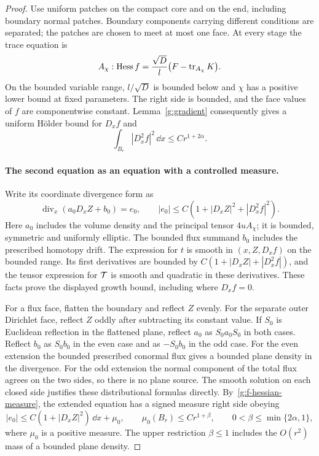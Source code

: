 \begin{proof}
Use uniform patches on the compact core and on the end, including
boundary normal patches.  Boundary components carrying different
conditions are separated; the patches are chosen to meet at most one
face.  At every stage the trace equation is
\begin{equation}\label{g:trace-normalized}
 A_\chi:\operatorname{Hess} f
     =\frac{\sqrt D}{l}\bigl(F-\operatorname{tr}_{A_\chi}K\bigr).
\end{equation}
On the bounded variable range, $l/\sqrt D$ is bounded below and
$\chi$ has a positive lower bound at fixed parameters.  The right side
is bounded, and the face values of $f$ are componentwise constant.
Lemma~\ref{g:gradient} consequently gives a uniform H\"older bound for
$D_xf$ and
\begin{equation}\label{g:f-hessian-measure}
 \int_{B_r}|D_x^2f|^2\,\dd x\leq Cr^{1+2\alpha}.
\end{equation}

\paragraph{The second equation as an equation with a controlled measure.}
Write its coordinate divergence form as
\begin{equation}\label{g:Z-divergence}
 \operatorname{div}_x(a_0D_xZ+b_0)=e_0,
 \qquad |e_0|\leq C(1+|D_xZ|^2+|D_x^2f|^2).
\end{equation}
Here $a_0$ includes the volume density and the principal tensor
$4uA_\chi$; it is bounded, symmetric and uniformly elliptic.  The
bounded flux summand $b_0$ includes the prescribed homotopy drift.
The expression for $t$ is smooth in $(x,Z,D_xf)$ on the bounded range.
Its first derivatives are bounded by
$C(1+|D_xZ|+|D_x^2f|)$, and the tensor expression for $\mathcal T$ is
smooth and quadratic in these derivatives.  These facts prove the
displayed growth bound, including where $D_xf=0$.

For a flux face, flatten the boundary and reflect $Z$ evenly.  For the
separate outer Dirichlet face, reflect $Z$ oddly after subtracting its
constant value.  If $S_0$ is Euclidean reflection in the flattened
plane, reflect $a_0$ as $S_0a_0S_0$ in both cases.  Reflect $b_0$ as
$S_0b_0$ in the even case and as $-S_0b_0$ in the odd case.
For the even extension the bounded prescribed conormal flux gives a
bounded plane density in the divergence.  For the odd extension the
normal component of the total flux agrees on the two sides, so there
is no plane source.  The smooth solution on each closed side justifies
these distributional formulas directly.  By~\eqref{g:f-hessian-measure},
the extended equation has a signed measure right side obeying
\begin{equation}\label{g:measure-growth}
 |e_0|\leq C(1+|D_xZ|^2)\,\dd x+\mu_0,
 \qquad \mu_0(B_r)\leq Cr^{1+\beta},\qquad
 0<\beta\leq\min\{2\alpha,1\},
\end{equation}
where $\mu_0$ is a positive measure.  The upper restriction
$\beta\leq1$ includes the $O(r^2)$ mass of a bounded plane density.


\end{proof}
